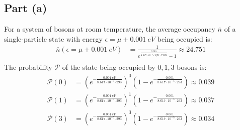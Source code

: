 \documentclass{article}
\begin{document}
\subsection*{Part (a)}
For a system of bosons at room temperature, the average occupancy $\overline{n}$ of a single-particle state with energy $\epsilon = \mu + 0.001~\unit{eV}$ being occupied is:
\begin{equation}
    \begin{split}
        \overline{n}\left(\epsilon = \mu + 0.001~\unit{eV}\right) & = \frac{1}{e^{\frac{0.001}{8.617 \cdot 10^{-5}~\unit{eV\per\kelvin} \cdot 293~\unit{\kelvin}}} - 1} \approx 24.751 \\
    \end{split}
\end{equation}
The probability $\mathcal{P}$ of the state being occupied by $0, 1, 3$ bosons is:
\begin{equation}
    \begin{split}
        \mathcal{P}\left(0\right) & = {\left(e^{-\frac{0.001~\unit{eV}}{8.617 \cdot 10^{-5} \cdot 293}}\right)}^0\left(1 - e^{-\frac{0.001}{8.617 \cdot 10^{-5} \cdot 293}}\right) \approx 0.039 \\
        \mathcal{P}\left(1\right) & = {\left(e^{-\frac{0.001~\unit{eV}}{8.617 \cdot 10^{-5} \cdot 293}}\right)}^1\left(1 - e^{-\frac{0.001}{8.617 \cdot 10^{-5} \cdot 293}}\right) \approx 0.037 \\
        \mathcal{P}\left(3\right) & = {\left(e^{-\frac{0.001~\unit{eV}}{8.617 \cdot 10^{-5} \cdot 293}}\right)}^3\left(1 - e^{-\frac{0.001}{8.617 \cdot 10^{-5} \cdot 293}}\right) \approx 0.034 \\
    \end{split}
\end{equation}
\end{document}
